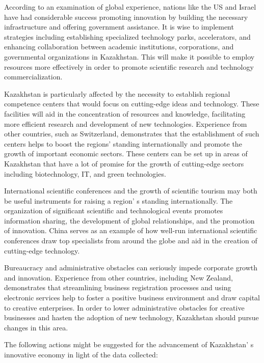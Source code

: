 According to an examination of global experience, nations like the US
and Israel have had considerable success promoting innovation by
building the necessary infrastructure and offering government
assistance. It is wise to implement strategies including establishing
specialized technology parks, accelerators, and enhancing collaboration
between academic institutions, corporations, and governmental
organizations in Kazakhstan. This will make it possible to employ
resources more effectively in order to promote scientific research and
technology commercialization.

Kazakhstan is particularly affected by the necessity to establish
regional competence centers that would focus on cutting-edge ideas and
technology. These facilities will aid in the concentration of resources
and knowledge, facilitating more efficient research and development of
new technologies. Experience from other countries, such as Switzerland,
demonstrates that the establishment of such centers helps to boost the
regions'{} standing internationally and promote the
growth of important economic sectors. These centers can be set up in
areas of Kazakhstan that have a lot of promise for the growth of
cutting-edge sectors including biotechnology, IT, and green
technologies.

International scientific conferences and the growth of scientific
tourism may both be useful instruments for raising a
region' s standing internationally. The organization of
significant scientific and technological events promotes information
sharing, the development of global relationships, and the promotion of
innovation. China serves as an example of how well-run international
scientific conferences draw top specialists from around the globe and
aid in the creation of cutting-edge technology.

Bureaucracy and administrative obstacles can seriously impede corporate
growth and innovation. Experience from other countries, including New
Zealand, demonstrates that streamlining business registration processes
and using electronic services help to foster a positive business
environment and draw capital to creative enterprises. In order to lower
administrative obstacles for creative businesses and hasten the adoption
of new technology, Kazakhstan should pursue changes in this area.

The following actions might be suggested for the advancement of
Kazakhstan' s innovative economy in light of the data
collected:

